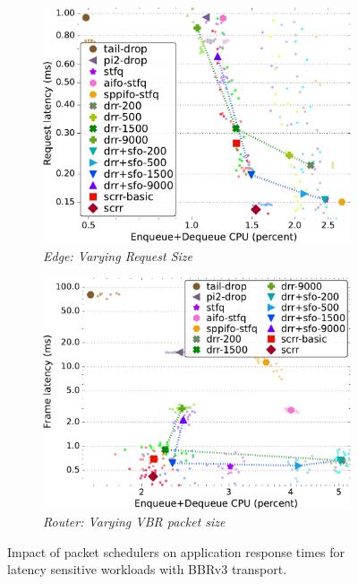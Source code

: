 \begin{figure}[th!]
\begin{subfigure}[t]{.30\linewidth}
    \includegraphics[width=0.95\linewidth]{figs/pkt_size_edge_cn_2t1x32_mn_2tb1x8_bbr3_kp_lat_comp_methods.pdf}
    \caption{\small{\textit{Edge: Varying Request Size}}}
    \label{fig:request-edge-bbr3-cpu-latency-full}
  \end{subfigure}
  \begin{subfigure}[t]{.30\linewidth}
    \centering
    \includegraphics[width=0.95\linewidth]{figs/pkt_size_cn_2t4x16_mn_2ui32_bbr3_kp_lat_comp_methods.pdf}
    \caption{\small{\textit{Router: Varying VBR packet size}}}
    \label{fig:vbr-bbr3-cpu-latency-full}
  \end{subfigure}
  \vspace{-3mm}
  \caption{\small{Impact of packet schedulers on application response times for latency sensitive workloads with BBRv3 transport.}}
  \vspace{-0.4cm}
  \label{fig:latency-bbr3}
\end{figure}

